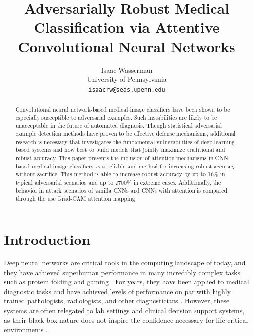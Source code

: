 \documentclass[10pt,twocolumn,letterpaper]{article}
\begin{document}
\title{Adversarially Robust Medical Classification via Attentive Convolutional Neural Networks}

\author{Isaac Wasserman\\
  University of Pennsylvania\\
  {\tt\small isaacrw@seas.upenn.edu}
}
\maketitle

\begin{abstract}
  Convolutional neural network-based medical image classifiers have been shown to be especially susceptible to adversarial examples. Such instabilities are likely to be unacceptable in the future of automated diagnosis. Though statistical adversarial example detection methods have proven to be effective defense mechanisms, additional research is necessary that investigates the fundamental vulnerabilities of deep-learning-based systems and how best to build models that jointly maximize traditional and robust accuracy. This paper presents the inclusion of attention mechanisms in CNN-based medical image classifiers as a reliable and method for increasing robust accuracy without sacrifice. This method is able to increase robust accuracy by up to 16\% in typical adversarial scenarios and up to 2700\% in extreme cases. Additionally, the behavior in attack scenarios of vanilla CNNs and CNNs with attention is compared through the use Grad-CAM attention mapping.
\end{abstract}

\section{Introduction}
  Deep neural networks are critical tools in the computing landscape of today, and they have achieved superhuman performance in many incredibly complex tasks such as protein folding \cite{alphafold} and gaming \cite{muzero}. For years, they have been applied to medical diagnostic tasks and have achieved levels of performance on par with highly trained pathologists, radiologists, and other diagnosticians \cite{medical-cnn-survey}. However, these systems are often relegated to lab settings and clinical decision support systems, as their black-box nature does not inspire the confidence necessary for life-critical environments \cite{NIH-AI}\cite{AI-CDSS}.
  
\end{document}
